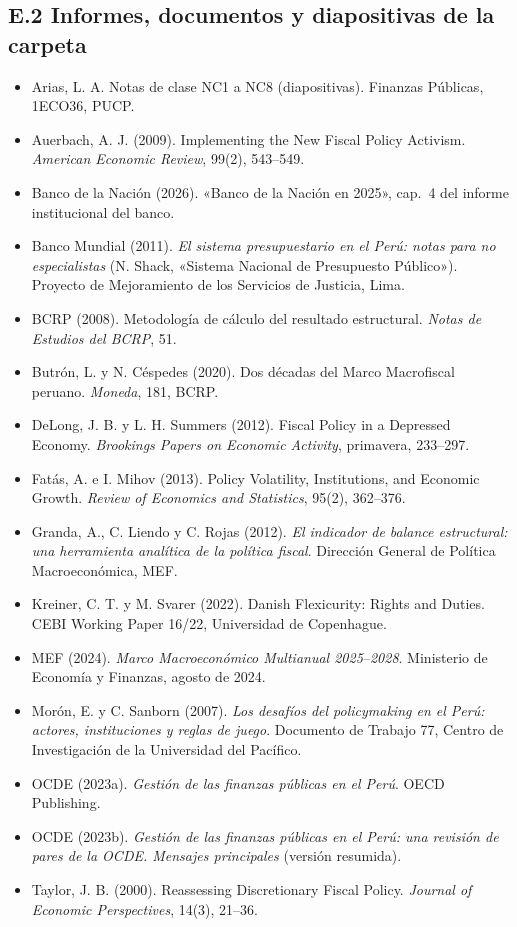 \documentclass[11pt,a4paper]{article}
\begin{document}
\subsection*{E.2 Informes, documentos y diapositivas de la carpeta}
{\small
\begin{itemize}[leftmargin=1.4em,itemsep=1pt,label={}]
\item Arias, L. A. Notas de clase NC1 a NC8 (diapositivas). Finanzas Públicas, 1ECO36, PUCP.
\item Auerbach, A. J. (2009). Implementing the New Fiscal Policy Activism. \emph{American Economic Review}, 99(2), 543--549.
\item Banco de la Nación (2026). «Banco de la Nación en 2025», cap.~4 del informe institucional del banco.
\item Banco Mundial (2011). \emph{El sistema presupuestario en el Perú: notas para no especialistas} (N. Shack, «Sistema Nacional de Presupuesto Público»). Proyecto de Mejoramiento de los Servicios de Justicia, Lima.
\item BCRP (2008). Metodología de cálculo del resultado estructural. \emph{Notas de Estudios del BCRP}, 51.
\item Butrón, L. y N. Céspedes (2020). Dos décadas del Marco Macrofiscal peruano. \emph{Moneda}, 181, BCRP.
\item DeLong, J. B. y L. H. Summers (2012). Fiscal Policy in a Depressed Economy. \emph{Brookings Papers on Economic Activity}, primavera, 233--297.
\item Fatás, A. e I. Mihov (2013). Policy Volatility, Institutions, and Economic Growth. \emph{Review of Economics and Statistics}, 95(2), 362--376.
\item Granda, A., C. Liendo y C. Rojas (2012). \emph{El indicador de balance estructural: una herramienta analítica de la política fiscal}. Dirección General de Política Macroeconómica, MEF.
\item Kreiner, C. T. y M. Svarer (2022). Danish Flexicurity: Rights and Duties. CEBI Working Paper 16/22, Universidad de Copenhague.
\item MEF (2024). \emph{Marco Macroeconómico Multianual 2025--2028}. Ministerio de Economía y Finanzas, agosto de 2024.
\item Morón, E. y C. Sanborn (2007). \emph{Los desafíos del policymaking en el Perú: actores, instituciones y reglas de juego}. Documento de Trabajo 77, Centro de Investigación de la Universidad del Pacífico.
\item OCDE (2023a). \emph{Gestión de las finanzas públicas en el Perú}. OECD Publishing.
\item OCDE (2023b). \emph{Gestión de las finanzas públicas en el Perú: una revisión de pares de la OCDE. Mensajes principales} (versión resumida).
\item Taylor, J. B. (2000). Reassessing Discretionary Fiscal Policy. \emph{Journal of Economic Perspectives}, 14(3), 21--36.
\end{itemize}
}
\end{document}
